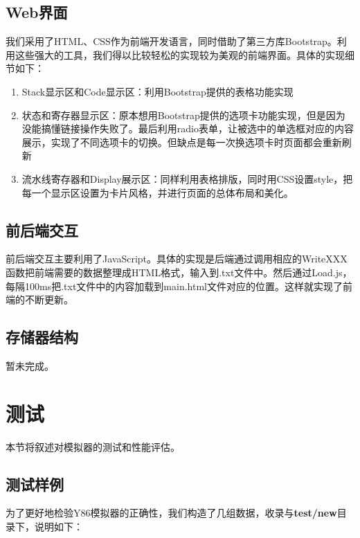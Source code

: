 \documentclass[12pt]{article} %
\begin{document}
\begin{sloppypar}
\subsection{Web界面}

我们采用了HTML、CSS作为前端开发语言，同时借助了第三方库Bootstrap。利用这些强大的工具，我们得以比较轻松的实现较为美观的前端界面。具体的实现细节如下：

\begin{enumerate}
\item Stack显示区和Code显示区：利用Bootstrap提供的表格功能实现
\item 状态和寄存器显示区：原本想用Bootstrap提供的选项卡功能实现，但是因为没能搞懂链接操作失败了。最后利用radio表单，让被选中的单选框对应的内容展示，实现了不同选项卡的切换。但缺点是每一次换选项卡时页面都会重新刷新
\item 流水线寄存器和Display展示区：同样利用表格排版，同时用CSS设置style，把每一个显示区设置为卡片风格，并进行页面的总体布局和美化。
\end{enumerate}

\subsection{前后端交互}

前后端交互主要利用了JavaScript。具体的实现是后端通过调用相应的WriteXXX函数把前端需要的数据整理成HTML格式，输入到.txt文件中。然后通过Load.js，每隔100ms把.txt文件中的内容加载到main.html文件对应的位置。这样就实现了前端的不断更新。

\subsection{存储器结构}

暂未完成。

\clearpage
\section{测试}

本节将叙述对模拟器的测试和性能评估。

\subsection{测试样例}

为了更好地检验Y86模拟器的正确性，我们构造了几组数据，收录与{\bf test/new}目录下，说明如下：


\end{sloppypar}
\end{document}
